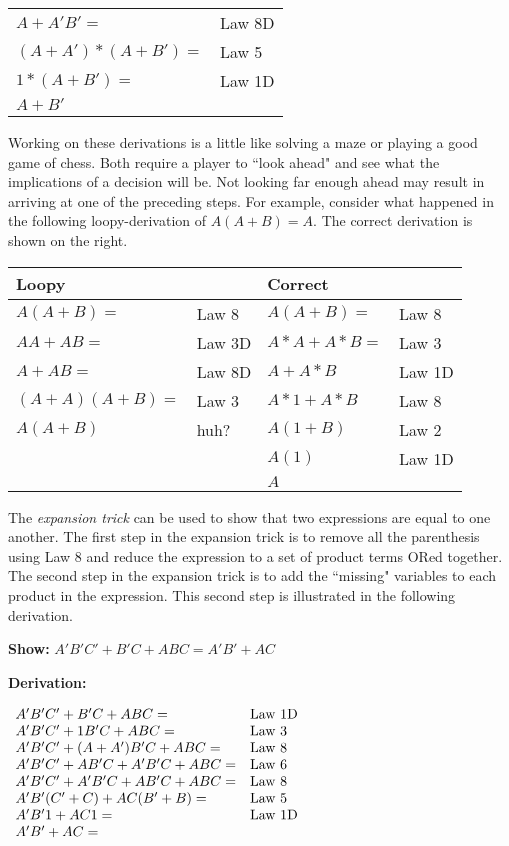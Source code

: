 \begin{tabular}[ht]{ll}
$A + A'B' =$		& Law 8D \\
$(A+A')*(A+B')=$	& Law 5 \\
$1*(A+B')=$ 		& Law 1D \\
$A+B'$ \\
\end{tabular}

Working on these derivations is a little like solving a maze or playing
a good game of chess.  Both require a player to ``look ahead" and see what the 
implications of a decision will be.  Not looking far enough ahead may
result in arriving at one of the preceding steps.  For example, consider what 
happened in the following loopy-derivation of $A(A+B)=A$.  The correct 
derivation is shown on the right.

\begin{tabular}[ht]{ll|ll}
Loopy		&		& Correct	&		\\ \hline
$A(A+B)=$ 	& Law 8	& $A(A+B)=$ & Law 8	\\ 
$AA + AB=$ 	& Law 3D	& $A*A+A*B=$& Law 3	\\ 
$A+AB=$	& Law 8D	& $A+A*B$ 	& Law 1D	\\ 
$(A+A)(A+B)=$& Law 3	& $A*1+A*B$	& Law 8	\\ 
$A(A+B)$	& huh?	& $A(1+B)$	& Law 2	\\
		&		& $A(1)$	& Law 1D	\\
		&		& $A$		& \\
\end{tabular}

The \textit{expansion trick} can be used to show that two expressions are 
equal to one another.
  The first step in the expansion trick is
to remove all the parenthesis using Law 8 and reduce the expression
to a set of product terms ORed together. The second step in the 
expansion trick is to add the ``missing" variables to each product 
in the expression.  This second step is illustrated in the following
derivation.

\textbf{Show:} $A'B'C' + B'C + ABC = A'B' + AC$

\textbf{Derivation:} 

$\begin{array}[ht]{ll}
A'B'C' + B'C + ABC =		& \text{Law 1D} \\
A'B'C' + 1B'C + ABC = 		& \text{Law 3} \\
A'B'C' + (A+A')B'C + ABC = 	& \text{Law 8} \\
A'B'C' + AB'C +A'B'C + ABC = 	& \text{Law 6} \\
A'B'C' + A'B'C +AB'C + ABC = 	& \text{Law 8} \\
A'B'(C' + C) +AC(B' + B) = 	& \text{Law 5} \\
A'B'1 +AC1 = 			& \text{Law 1D} \\
A'B' +AC = 				&  \\
\end{array}$

